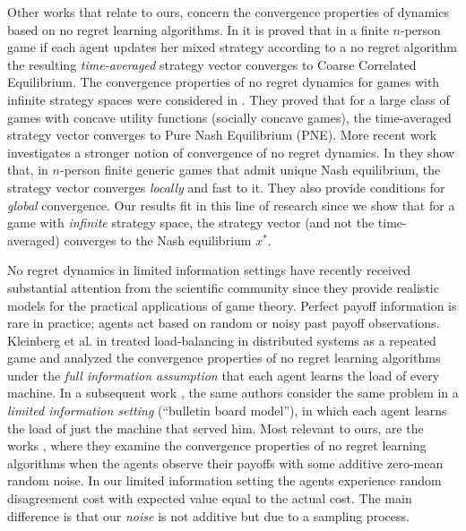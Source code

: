 Other works that relate to ours, concern the convergence properties of dynamics
based on no regret learning algorithms.  In \cite{FV97,FS99,SA00,SALS15} it is
proved that in a finite $n$-person game if each agent updates her mixed
strategy according to a no regret algorithm the resulting \emph{time-averaged}
strategy vector converges to Coarse Correlated Equilibrium. The convergence
properties of no regret dynamics for games with infinite strategy spaces were
considered in \cite{EMN09}.  They proved that for a large class of games with
concave utility functions (socially concave games), the time-averaged strategy
vector converges to Pure Nash Equilibrium (PNE). More recent work investigates
a stronger notion of convergence of no regret dynamics. In \cite{CHM17} they
show that, in $n$-person finite generic games that admit unique Nash
equilibrium, the strategy vector converges \emph{locally} and fast to it.
They also provide conditions for \emph{global} convergence.  Our
results fit in this line of research since we show that for a game with
\emph{infinite} strategy space, the strategy vector (and not the time-averaged)
converges to the Nash equilibrium $x^*$.

No regret dynamics in limited information settings have recently received
substantial attention from the scientific community since they provide
realistic models for the practical applications of game theory.  Perfect payoff
information is rare in practice; agents act based on random or noisy past
payoff observations.  Kleinberg et al. in \cite{KPT09} treated load-balancing
in distributed systems as a repeated game and analyzed the convergence
properties of no regret learning algorithms under the \emph{full information
  assumption} that each agent learns the load of every machine.  In a
subsequent work \cite{KPT11}, the same authors consider the same problem in a
\emph{limited information setting} (\enquote{bulletin board model}), in which
each agent learns the load of just the machine that served him. Most relevant
to ours, are the works \cite{HCM17,MS17,BM17,CHM17}, where they examine the
convergence properties of no regret learning algorithms when the agents observe
their payoffs with some additive zero-mean random noise. In our limited
information setting the agents experience random disagreement cost with
expected value equal to the actual cost.  The main difference is that our
\emph{noise} is not additive but due to a sampling process.
